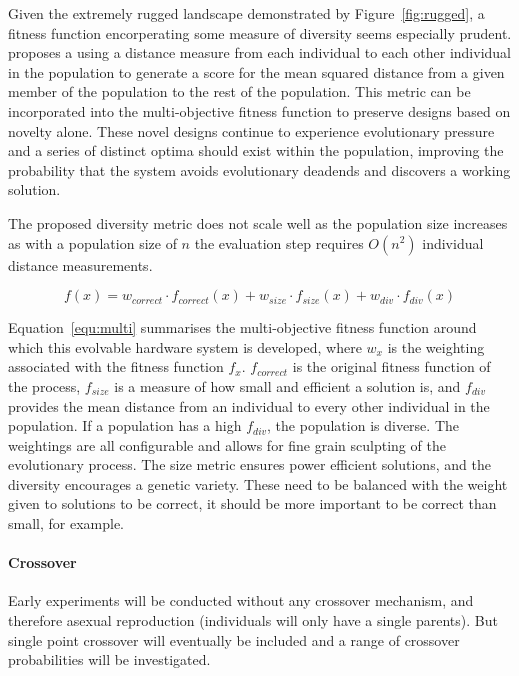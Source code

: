 Given the extremely rugged landscape demonstrated by Figure~\ref{fig:rugged}, a
fitness function encorperating some measure of diversity seems especially prudent.
\cite{deJong:2001:RBP:2955239.2955241} proposes a using a
distance measure from each individual to each other individual in the population
to generate a score for the mean squared distance from a given member of the
population to the rest of the population. This metric can be incorporated into
the multi-objective fitness function to preserve designs based on novelty alone.
These novel designs continue to experience evolutionary pressure and a series
of distinct optima should exist within the population, improving the probability
that the system avoids evolutionary deadends and discovers a working solution.

The proposed diversity metric does not scale well as the population size increases
as with a population size of $n$ the evaluation step requires $O(n^2)$ individual
distance measurements.

\begin{equation}
	\label{equ:multi}
	f(x) = w_{correct} \cdot f_{correct}(x) + w_{size} \cdot f_{size}(x) +
	w_{div} \cdot f_{div}(x)
\end{equation}

Equation~\ref{equ:multi} summarises the multi-objective fitness function around
which this evolvable hardware system is developed, where $w_x$ is the weighting
associated with the fitness function $f_x$. $f_{correct}$ is the original fitness
function of the process, $f_{size}$ is a measure of how small and efficient a
solution is, and $f_{div}$ provides the mean distance from an individual to
every other individual in the population. If a population has a high $f_{div}$,
the population is diverse.
The weightings are all
configurable and allows for fine grain sculpting of the evolutionary process.
The size metric ensures power efficient solutions, and the diversity encourages
a genetic variety. These need to be balanced with the weight given to solutions
to be correct, it should be more important to be correct than small, for example.

\paragraph{Crossover}
Early experiments will be conducted without any crossover mechanism, and therefore
asexual reproduction (individuals will only have a single parents). But single
point crossover will eventually be included and a range of crossover probabilities
will be investigated.


